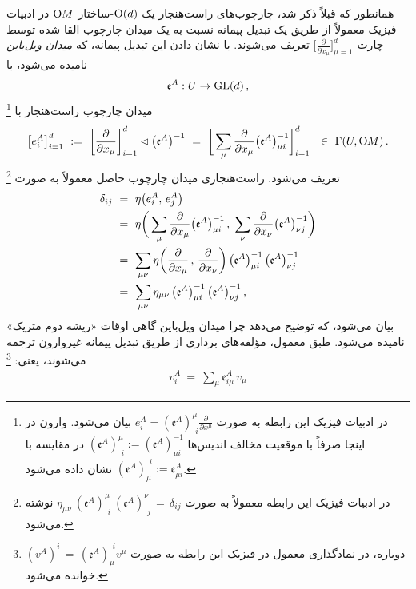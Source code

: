 همانطور که قبلاً ذکر شد، چارچوب‌های راست‌هنجار یک $\operatorname{O}(d)$-ساختار $\operatorname{O}\mkern-3.6muM$ در ادبیات فیزیک معمولاً از طریق یک تبدیل پیمانه نسبت به یک میدان چارچوب القا شده توسط چارت $\big[ \frac{\partial}{\partial x_\mu} \big]_{\mu=1}^d$ تعریف می‌شوند.
با نشان دادن این تبدیل پیمانه، که \emph{میدان ویل‌باین} نامیده می‌شود، با
\begin{align}
	\mathfrak{e}^A: U \to \operatorname{GL}(d) \,,
\end{align}
میدان چارچوب راست‌هنجار با%
\footnote{
	در ادبیات فیزیک این رابطه به صورت
	$e^A_i = (\mathfrak{e}^A)^{\mu}_{\,\ i} \frac{\partial}{\partial x^\mu}$
	بیان می‌شود. وارون در اینجا صرفاً با موقعیت مخالف اندیس‌ها
	$(\mathfrak{e}^A)^\mu_{\,\ i} := (\mathfrak{e}^A)^{-1}_{\mu i}$ 
	در مقایسه با
	$(\mathfrak{e}^A)_\mu^{\,\ i} := \mathfrak{e}^A_{\mu i}$
	نشان داده می‌شود.
}
\begin{align}
	\big[e^A_i\big]_{i=1}^d
	\ :=\ \bigg[ \frac{\partial}{\partial x_\mu} \bigg]_{i=1}^d \lhd \big(\mathfrak{e}^A\big)^{-1}
	\  =\ \bigg[ \sum_\mu \frac{\partial}{\partial x_\mu} \big(\mathfrak{e}^A\big)^{-1}_{\mu i} \bigg]_{i=1}^d
	\ \ \in\ \Gamma(U, \operatorname{O}\mkern-3.6muM) \,.
\end{align}
تعریف می‌شود. راست‌هنجاری میدان چارچوب حاصل معمولاً به صورت%
\footnote{
	در ادبیات فیزیک این رابطه معمولاً به صورت
	$\eta_{\mu\nu}\ (\mathfrak{e}^A)^\mu_{\,\ i}\ (\mathfrak{e}^A)^\nu_{\,\ j}\, =\, \delta_{ij}$ نوشته می‌شود.
}
\begin{align}
	\delta_{ij}
	\ &=\ \eta\big( e_i^A,\, e_j^A \big) \notag \\
	\ &=\ \eta\bigg( \sum_\mu \frac{\partial}{\partial x_\mu} \big(\mathfrak{e}^A\big)^{-1}_{\mu i}  \,,\; \sum_\nu \frac{\partial}{\partial x_\nu} \big(\mathfrak{e}^A\big)^{-1}_{\nu j} \bigg) \notag \\
	\ &=\ \sum_{\mu\nu} \eta\bigg( \frac{\partial}{\partial x_\mu} \,,\, \frac{\partial}{\partial x_\nu} \bigg)\, \big(\mathfrak{e}^A\big)^{-1}_{\mu i}\, \big(\mathfrak{e}^A\big)^{-1}_{\nu j} \notag \\
	\ &=\ \sum_{\mu\nu} \eta_{\mu\nu}\, \big(\mathfrak{e}^A\big)^{-1}_{\mu i}\, \big(\mathfrak{e}^A\big)^{-1}_{\nu j} \,,
\end{align}
بیان می‌شود، که توضیح می‌دهد چرا میدان ویل‌باین گاهی اوقات «ریشه دوم متریک» نامیده می‌شود.
طبق معمول، مؤلفه‌های برداری از طریق تبدیل پیمانه غیروارون ترجمه می‌شوند، یعنی:%
\footnote{
	دوباره، در نمادگذاری معمول در فیزیک این رابطه به صورت $(v^A)^i\, =\, (\mathfrak{e}^A)_\mu^{\,\ i} v^\mu$ خوانده می‌شود.
}
\begin{align}
	v^A_i\ =\ \sum_\mu \mathfrak{e}^A_{i\mu}\, v_\mu
\end{align}

